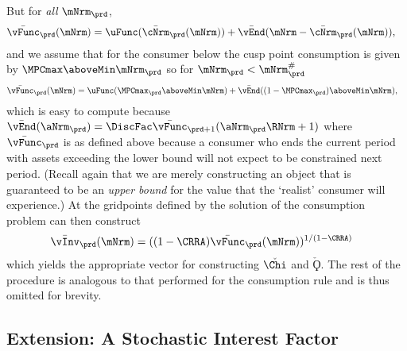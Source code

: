   But for \textit{all} $\mNrm_{\prd}$,
  \begin{equation*}\begin{gathered}\begin{aligned}
        \bar{\vFunc}_{\prd}(\mNrm)  & = \uFunc(\bar{\cNrm}_{\prd}(\mNrm))+ \bar{\vEnd}(\mNrm-\bar{\cNrm}_{\prd}(\mNrm)),
      \end{aligned}\end{gathered}\end{equation*}
  and we assume that for the consumer below the cusp point consumption is given by $\MPCmax \aboveMin \mNrm_{\prd}$ so for $\mNrm_{\prd}< \mtCusp$
  \begin{equation*}\begin{gathered}\begin{aligned}
        \bar{\vFunc}_{\prd}(\mNrm)  & = \uFunc( \MPCmax_{\prd} \aboveMin \mNrm)+ \bar{\vEnd}((1-\MPCmax_{\prd})\aboveMin \mNrm),
      \end{aligned}\end{gathered}\end{equation*}
  which is easy to compute because $\bar{\vEnd}(\aNrm_{\prd}) = \DiscFac \bar{\vFunc}_{\prd+1}(\aNrm_{\prd}\RNrm+1)$ where $\bar{\vFunc}_{\prd}$ is as defined above because a consumer who ends the current period with assets exceeding the lower bound will not expect to be constrained next period.  (Recall again that we are merely constructing an object that is guaranteed to be an \textit{upper bound} for the value that the `realist' consumer will experience.)  At the gridpoints defined by the solution of the consumption problem can then construct
  \begin{equation*}\begin{gathered}\begin{aligned}
        \bar{\vInv}_{\prd}(\mNrm)  & = ((1-\CRRA)\bar{\vFunc}_{\prd}(\mNrm))^{1/(1-\CRRA)}
      \end{aligned}\end{gathered}\end{equation*}
 which yields the appropriate vector for constructing $\check{\Chi}$ and $\check{\Koppa}$.  The rest of the procedure is analogous to that performed for the consumption rule and is thus omitted for brevity.


\hypertarget{extension-a-stochastic-interest-factor}{}
\subsection{Extension: A Stochastic Interest Factor}


